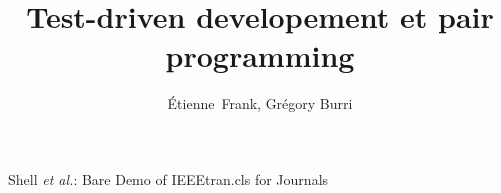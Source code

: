 \documentclass[journal, a4paper]{IEEEtran}
\begin{document}
%
\title{Test-driven developement et pair programming}
%
%
%

\author{Étienne~Frank, Grégory Burri}

% 
%



%
{Shell \MakeLowercase{\textit{et al.}}: Bare Demo of IEEEtran.cls for Journals}
% 




\end{document}

